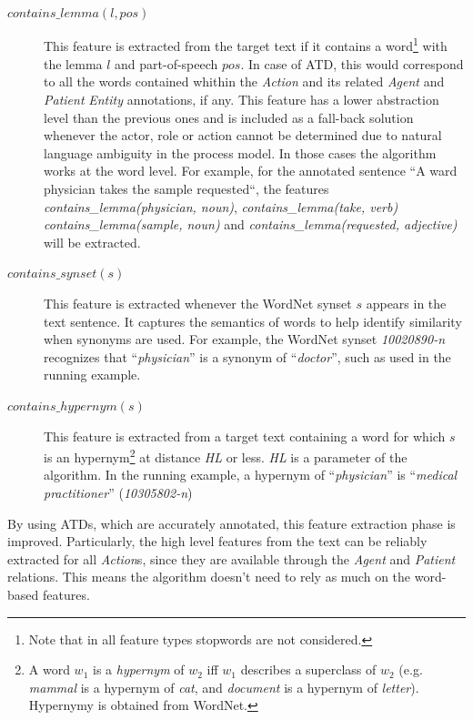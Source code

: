 \begin{description}
       \item[$contains\_lemma(l, pos)$]{This feature is extracted from the
           target text if it contains a word\footnote{Note that in all feature
             types stopwords are not considered.} with the lemma $l$ and
           part-of-speech $pos$. In case of ATD, this would correspond to all
           the words contained whithin the \emph{Action} and its related
           \emph{Agent} and \emph{Patient} \emph{Entity} annotations, if any.
           This feature has a lower abstraction level than
           the previous ones and is included as a fall-back solution
           whenever the actor, role or action cannot be determined due to
           natural language ambiguity in the process model. In those cases the
           algorithm works at the word level. For example, for the annotated
           sentence ``A ward physician takes the sample requested``, the
           features \textit{contains\_lemma(physician, noun)},
           \textit{contains\_lemma(take, verb)} \textit{contains\_lemma(sample,
             noun)} and \textit{contains\_lemma(requested, adjective)} will be
           extracted.}
         
       \item[$contains\_synset(s)$]{This feature is extracted whenever the
           WordNet synset $s$ appears in the text sentence. It captures the
           semantics of words to help identify similarity when synonyms are
           used. For example, the WordNet synset \textit{10020890-n} recognizes
           that ``\textit{physician}'' is a synonym of ``\textit{doctor}'',
           such as used in the running example.}

       \item[$contains\_hypernym(s)$]{This feature is extracted from a target
           text containing a word for which $s$ is an hypernym\footnote{A word
             $w_1$ is a \textit{hypernym} of $w_2$ iff $w_1$ describes a
             superclass of $w_2$ (e.g. \textit{mammal} is a hypernym of
             \textit{cat}, and \textit{document} is a hypernym of
             \textit{letter}). Hypernymy is obtained from WordNet.} at distance
           \emph{HL} or less. \emph{HL} is a parameter of the algorithm. In the
           running example, a hypernym of ``\textit{physician}'' is
           ``\textit{medical practitioner}'' (\textit{10305802-n})}
\end{description}

By using ATDs, which are accurately annotated, this feature extraction phase is
improved. Particularly, the high level features from the text can be reliably
extracted for all \emph{Action}s, since they are available through the
\emph{Agent} and \emph{Patient} relations. This means the algorithm doesn't need
to rely as much on the word-based features.

